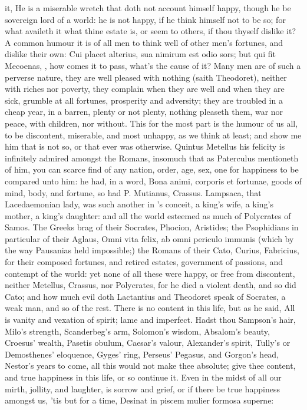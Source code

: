 {{it, He is a miserable wretch that doth not account himself happy,
though he be sovereign lord of a world: he is not happy, if he think
himself not to be so; for what availeth it what thine estate is, or
seem to others, if thou thyself dislike it? A common humour it is of
all men to think well of other men's fortunes, and dislike their own:
Cui placet alterius, sua nimirum est odio sors; but qui fit
Mecoenas, \etc{}, how comes it to pass, what's the cause of it? Many men
are of such a perverse nature, they are well pleased with nothing
(saith Theodoret), neither with riches nor poverty, they
complain when they are well and when they are sick, grumble at all
fortunes, prosperity and adversity; they are troubled in a cheap year,
in a barren, plenty or not plenty, nothing pleaseth them, war nor
peace, with children, nor without. This for the most part is the humour
of us all, to be discontent, miserable, and most unhappy, as we think
at least; and show me him that is not so, or that ever was otherwise.
Quintus Metellus his felicity is infinitely admired amongst the Romans,
insomuch that as Paterculus mentioneth of him, you can scarce
find of any nation, order, age, sex, one for happiness to be compared
unto him: he had, in a word, Bona animi, corporis et fortunae, goods of
mind, body, and fortune, so had P. Mutianus, Crassus. Lampsaca,
that Lacedaemonian lady, was such another in \Pliny{}'s conceit, a
king's wife, a king's mother, a king's daughter: and all the world
esteemed as much of Polycrates of Samos. The Greeks brag of their
Socrates, Phocion, Aristides; the Psophidians in particular of their
Aglaus, Omni vita felix, ab omni periculo immunis (which by the way
Pausanias held impossible;) the Romans of their  Cato, Curius,
Fabricius, for their composed fortunes, and retired estates, government
of passions, and contempt of the world: yet none of all these were
happy, or free from discontent, neither Metellus, Crassus, nor
Polycrates, for he died a violent death, and so did Cato; and how much
evil doth Lactantius and Theodoret speak of Socrates, a weak man, and
so of the rest. There is no content in this life, but as he said,
All is vanity and vexation of spirit; lame and imperfect. Hadst thou
Sampson's hair, Milo's strength, Scanderbeg's arm, Solomon's wisdom,
Absalom's beauty, Croesus' wealth, Pasetis obulum, Caesar's valour,
Alexander's spirit, Tully's or Demosthenes' eloquence, Gyges' ring,
Perseus' Pegasus, and Gorgon's head, Nestor's years to come, all this
would not make thee absolute; give thee content, and true happiness in
this life, or so continue it. Even in the midst of all our mirth,
jollity, and laughter, is sorrow and grief, or if there be true
happiness amongst us, 'tis but for a time,
Desinat in piscem mulier formosa superne:

}}
